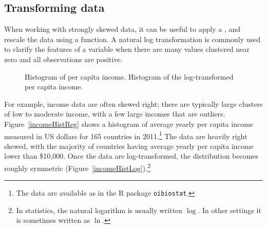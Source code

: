 \subsection{Transforming data}
\label{transformingDataSubsection}

When working with strongly skewed data, it can be useful to apply a , and rescale the data using a function. A natural log transformation is commonly used to clarify the features of a variable when there are many values clustered near zero and all observations are positive.

\begin{figure}[ht]
	\centering
	\caption{ Histogram of per capita income.  Histogram of the log-transformed per capita income.}
	\label{incomeHistTransform}
\end{figure}

For example, income data are often skewed right; there are typically large clusters of low to moderate income, with a few large incomes that are outliers. Figure~\ref{incomeHistReg} shows a histogram of average yearly per capita income measured in US dollars for 165 countries in 2011.\footnote{The data are available as  in the \textsf{R} package \texttt{oibiostat}.} The data are heavily right skewed, with the majority of countries having average yearly per capita income lower than \$10,000. Once the data are log-transformed, the distribution becomes roughly symmetric (Figure~\ref{incomeHistLog}).\footnote{In statistics, the natural logarithm is usually written $\log$. In other settings it is sometimes written as  $\ln$.} 

